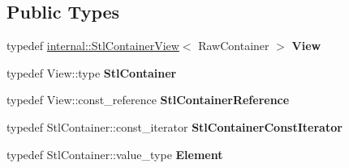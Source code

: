\subsection*{Public Types}
\begin{DoxyCompactItemize}
\item 
\mbox{\label{classtesting_1_1internal_1_1_unordered_elements_are_matcher_impl_adbd6dfef7713dd30d569b4220eb808d3}} 
typedef \mbox{\hyperlink{classtesting_1_1internal_1_1_stl_container_view}{internal\+::\+Stl\+Container\+View}}$<$ Raw\+Container $>$ {\bfseries View}
\item 
\mbox{\label{classtesting_1_1internal_1_1_unordered_elements_are_matcher_impl_a6c23354dfe53bb47fa3d38d2869e273c}} 
typedef View\+::type {\bfseries Stl\+Container}
\item 
\mbox{\label{classtesting_1_1internal_1_1_unordered_elements_are_matcher_impl_acf64d0e328361d4796bcf1aeb91ed975}} 
typedef View\+::const\+\_\+reference {\bfseries Stl\+Container\+Reference}
\item 
\mbox{\label{classtesting_1_1internal_1_1_unordered_elements_are_matcher_impl_a656c30399e17043db476b639dcd4e6fa}} 
typedef Stl\+Container\+::const\+\_\+iterator {\bfseries Stl\+Container\+Const\+Iterator}
\item 
\mbox{\label{classtesting_1_1internal_1_1_unordered_elements_are_matcher_impl_ad62ba6ff582afe086d522951f94e30d0}} 
typedef Stl\+Container\+::value\+\_\+type {\bfseries Element}
\end{DoxyCompactItemize}
